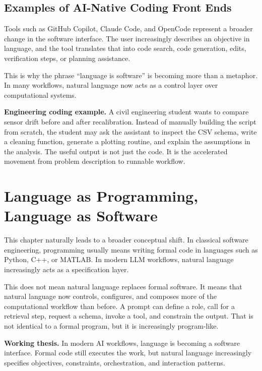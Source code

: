 \documentclass[12pt]{article}
\begin{document}
\subsection{Examples of AI-Native Coding Front Ends}

Tools such as GitHub Copilot, Claude Code, and OpenCode represent a broader change in the software interface. The user increasingly describes an objective in language, and the tool translates that into code search, code generation, edits, verification steps, or planning assistance.

This is why the phrase ``language is software'' is becoming more than a metaphor. In many workflows, natural language now acts as a control layer over computational systems.

\begin{ex-box}
\textbf{Engineering coding example.} A civil engineering student wants to compare sensor drift before and after recalibration. Instead of manually building the script from scratch, the student may ask the assistant to inspect the CSV schema, write a cleaning function, generate a plotting routine, and explain the assumptions in the analysis. The useful output is not just the code. It is the accelerated movement from problem description to runnable workflow.
\end{ex-box}

\section{Language as Programming, Language as Software}

This chapter naturally leads to a broader conceptual shift. In classical software engineering, programming usually means writing formal code in languages such as Python, C++, or MATLAB. In modern LLM workflows, natural language increasingly acts as a specification layer.

This does not mean natural language replaces formal software. It means that natural language now controls, configures, and composes more of the computational workflow than before. A prompt can define a role, call for a retrieval step, request a schema, invoke a tool, and constrain the output. That is not identical to a formal program, but it is increasingly program-like.

\begin{def-box}
\textbf{Working thesis.} In modern AI workflows, language is becoming a software interface. Formal code still executes the work, but natural language increasingly specifies objectives, constraints, orchestration, and interaction patterns.
\end{def-box}
\end{document}
